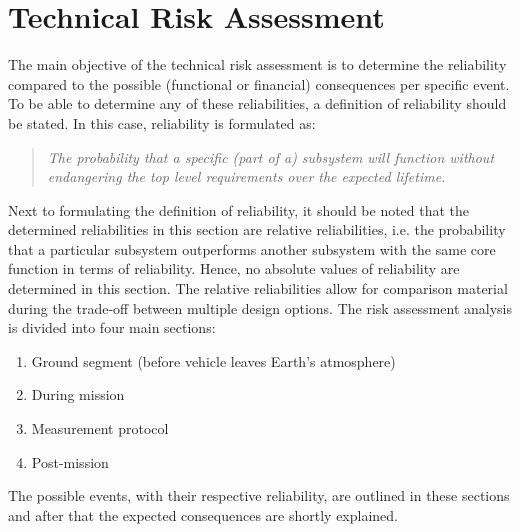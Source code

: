 \chapter{Technical Risk Assessment}
\label{RiskMan}
The main objective of the technical risk assessment is to determine the reliability compared to the possible (functional or financial) consequences per specific event. To be able to determine any of these reliabilities, a definition of reliability should be stated. In this case, reliability is formulated as:
\begin{quote}
\emph{The probability that a specific (part of a) subsystem will function without endangering the top level requirements over the expected lifetime.}
\end{quote}


Next to formulating the definition of reliability, it should be noted that the determined reliabilities in this section are relative reliabilities, i.e. the probability that a particular subsystem outperforms another subsystem with the same core function in terms of reliability. Hence, no absolute values of reliability are determined in this section. The relative reliabilities allow for comparison material during the trade-off between multiple design options. 
The risk assessment analysis is divided into four main sections: 
\begin{enumerate}[I]
	\item Ground segment (before vehicle leaves Earth's atmosphere)
	\item During mission
	\item Measurement protocol
	\item Post-mission
\end{enumerate}
The possible events, with their respective reliability, are outlined in these sections and after that the expected consequences are shortly explained. 

